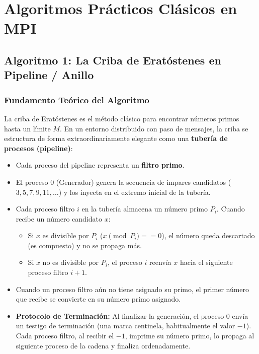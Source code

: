 \section{Algoritmos Prácticos Clásicos en MPI}

\subsection{Algoritmo 1: La Criba de Eratóstenes en Pipeline / Anillo}

\subsubsection{Fundamento Teórico del Algoritmo}
La criba de Eratóstenes es el método clásico para encontrar números primos hasta un límite $M$. En un entorno distribuido con paso de mensajes, la criba se estructura de forma extraordinariamente elegante como una \textbf{tubería de procesos (pipeline)}:

\begin{itemize}[leftmargin=*]
    \item Cada proceso del pipeline representa un \textbf{filtro primo}.
    \item El proceso 0 (Generador) genera la secuencia de impares candidatos ($3, 5, 7, 9, 11, \dots$) y los inyecta en el extremo inicial de la tubería.
    \item Cada proceso filtro $i$ en la tubería almacena un número primo $P_i$. Cuando recibe un número candidato $x$:
    \begin{itemize}
        \item Si $x$ es divisible por $P_i$ ($x \pmod{P_i} == 0$), el número queda descartado (es compuesto) y no se propaga más.
        \item Si $x$ no es divisible por $P_i$, el proceso $i$ reenvía $x$ hacia el siguiente proceso filtro $i+1$.
    \end{itemize}
    \item Cuando un proceso filtro aún no tiene asignado su primo, el primer número que recibe se convierte en su número primo asignado.
    \item \textbf{Protocolo de Terminación:} Al finalizar la generación, el proceso 0 envía un testigo de terminación (una marca centinela, habitualmente el valor $-1$). Cada proceso filtro, al recibir el $-1$, imprime su número primo, lo propaga al siguiente proceso de la cadena y finaliza ordenadamente.
\end{itemize}


